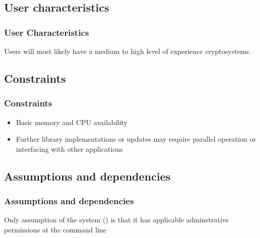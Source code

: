 
\subsection{User characteristics}
\begin{frame}
\frametitle{User Characteristics}
Users will most likely have a medium  to high level of experience cryptosystems.
\end{frame}


\subsection{Constraints}

\begin{frame}
\frametitle{Constraints}
\begin{itemize}
  \item Basic memory and CPU availability
  \item Further library implementations or updates may require parallel operation or interfacing with other applications
\end{itemize}
\end{frame}


\subsection{Assumptions and dependencies}

\begin{frame}
\frametitle{Assumptions and dependencies}
Only assumption of the system (\cry{}) is that it has applicable adminstrative permissions at the command line
\end{frame}


